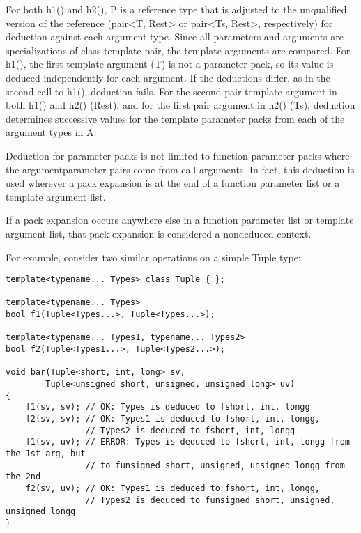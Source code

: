 For both h1() and h2(), P is a reference type that is adjusted to the unqualified version of the reference (pair<T, Rest> or pair<Ts, Rest>, respectively) for deduction against each argument type. Since all parameters and arguments are specializations of class template pair, the template arguments are compared. For h1(), the first template argument (T) is not a parameter pack, so its value is deduced independently for each argument. If the deductions differ, as in the second call to h1(), deduction fails. For the second pair template argument in both h1() and h2() (Rest), and for the first pair argument in h2() (Ts), deduction determines successive values for the template parameter packs from each of the argument types in A.

Deduction for parameter packs is not limited to function parameter packs where the argumentparameter pairs come from call arguments. In fact, this deduction is used wherever a pack expansion is at the end of a function parameter list or a template argument list.

\begin{tcolorbox}[colback=webgreen!5!white,colframe=webgreen!75!black]
\hspace*{0.75cm}If a pack expansion occurs anywhere else in a function parameter list or template argument list, that pack expansion is considered a nondeduced context.
\end{tcolorbox}

For example, consider two similar operations on a simple Tuple type:

\begin{lstlisting}[style=styleCXX]
template<typename... Types> class Tuple { };

template<typename... Types>
bool f1(Tuple<Types...>, Tuple<Types...>);

template<typename... Types1, typename... Types2>
bool f2(Tuple<Types1...>, Tuple<Types2...>);

void bar(Tuple<short, int, long> sv,
		Tuple<unsigned short, unsigned, unsigned long> uv)
{
	f1(sv, sv); // OK: Types is deduced to fshort, int, longg
	f2(sv, sv); // OK: Types1 is deduced to fshort, int, longg,
				// Types2 is deduced to fshort, int, longg
	f1(sv, uv); // ERROR: Types is deduced to fshort, int, longg from the 1st arg, but
				// to funsigned short, unsigned, unsigned longg from the 2nd
	f2(sv, uv); // OK: Types1 is deduced to fshort, int, longg,
				// Types2 is deduced to funsigned short, unsigned, unsigned longg
}
\end{lstlisting}


